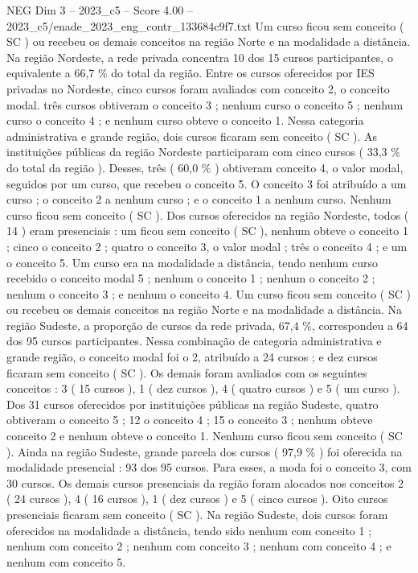 \begin{textsample}{NEG Dim 3 – 2023\_c5 – Score 4.00 – 2023\_c5/enade\_2023\_eng\_contr\_133684c9f7.txt}
Um curso ficou sem conceito ( SC ) ou recebeu os demais conceitos na região Norte e na modalidade a distância.
Na região Nordeste, a rede privada concentra 10 dos 15 cursos participantes, o equivalente a 66,7 \% do total da região.
Entre os cursos oferecidos por IES privadas no Nordeste, cinco cursos foram avaliados com conceito 2, o conceito modal. três cursos obtiveram o conceito 3 ; nenhum curso o conceito 5 ; nenhum curso o conceito 4 ; e nenhum curso obteve o conceito 1.
Nessa categoria administrativa e grande região, dois cursos ficaram sem conceito ( SC ).
As instituições públicas da região Nordeste participaram com cinco cursos ( 33,3 \% do total da região ).
Desses, três ( 60,0 \% ) obtiveram conceito 4, o valor modal, seguidos por um curso, que recebeu o conceito 5.
O conceito 3 foi atribuído a um curso ; o conceito 2 a nenhum curso ; e o conceito 1 a nenhum curso.
Nenhum curso ficou sem conceito ( SC ).
Dos cursos oferecidos na região Nordeste, todos ( 14 ) eram presenciais : um ficou sem conceito ( SC ), nenhum obteve o conceito 1 ; cinco o conceito 2 ; quatro o conceito 3, o valor modal ; três o conceito 4 ; e um o conceito 5.
Um curso era na modalidade a distância, tendo nenhum curso recebido o conceito modal 5 ; nenhum o conceito 1 ; nenhum o conceito 2 ; nenhum o conceito 3 ; e nenhum o conceito 4.
Um curso ficou sem conceito ( SC ) ou recebeu os demais conceitos na região Norte e na modalidade a distância.
Na região Sudeste, a proporção de cursos da rede privada, 67,4 \%, correspondeu a 64 dos 95 cursos participantes.
Nessa combinação de categoria administrativa e grande região, o conceito modal foi o 2, atribuído a 24 cursos ; e dez cursos ficaram sem conceito ( SC ).
Os demais foram avaliados com os seguintes conceitos : 3 ( 15 cursos ), 1 ( dez cursos ), 4 ( quatro cursos ) e 5 ( um curso ).
Dos 31 cursos oferecidos por instituições públicas na região Sudeste, quatro obtiveram o conceito 5 ; 12 o conceito 4 ; 15 o conceito 3 ; nenhum obteve conceito 2 e nenhum obteve o conceito 1.
Nenhum curso ficou sem conceito ( SC ).
Ainda na região Sudeste, grande parcela dos cursos ( 97,9 \% ) foi oferecida na modalidade presencial : 93 dos 95 cursos.
Para esses, a moda foi o conceito 3, com 30 cursos.
Os demais cursos presenciais da região foram alocados nos conceitos 2 ( 24 cursos ), 4 ( 16 cursos ), 1 ( dez cursos ) e 5 ( cinco cursos ).
Oito cursos presenciais ficaram sem conceito ( SC ).
Na região Sudeste, dois cursos foram oferecidos na modalidade a distância, tendo sido nenhum com conceito 1 ; nenhum com conceito 2 ; nenhum com conceito 3 ; nenhum com conceito 4 ; e nenhum com conceito 5.

\end{textsample}
